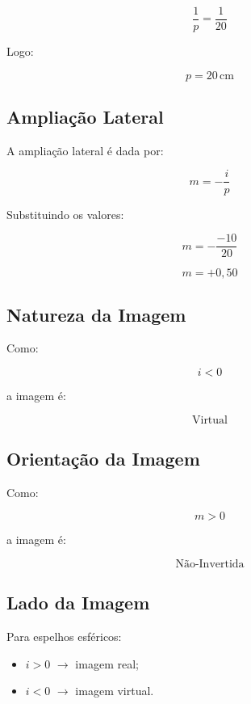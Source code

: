 \documentclass[12pt,a4paper]{article}
\begin{document}
\[
\frac{1}{p}
=
\frac{1}{20}
\]

Logo:

\[
p = 20\,\text{cm}
\]


\subsection*{Ampliação Lateral}

A ampliação lateral é dada por:

\[
m = -\frac{i}{p}
\]

Substituindo os valores:

\[
m
=
-\frac{-10}{20}
\]

\[
m = +0,50
\]


\subsection*{Natureza da Imagem}

Como:

\[
i < 0
\]

a imagem é:

\[
\boxed{\text{Virtual}}
\]


\subsection*{Orientação da Imagem}

Como:

\[
m > 0
\]

a imagem é:

\[
\boxed{\text{Não-Invertida}}
\]


\subsection*{Lado da Imagem}

Para espelhos esféricos:

\begin{itemize}
    \item $i > 0$ $\rightarrow$ imagem real;
    \item $i < 0$ $\rightarrow$ imagem virtual.
\end{itemize}
\end{document}
